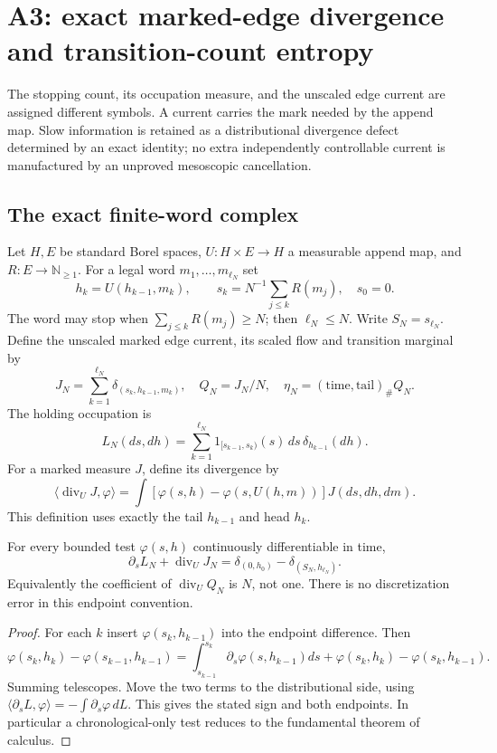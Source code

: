 \section{A3: exact marked-edge divergence and transition-count entropy}
\label{sec:r33-a3}

The stopping count, its occupation measure, and the unscaled edge current are assigned different symbols. A current carries the mark needed by the append map. Slow information is retained as a distributional divergence defect determined by an exact identity; no extra independently controllable current is manufactured by an unproved mesoscopic cancellation.

\subsection{The exact finite-word complex}
Let $H,E$ be standard Borel spaces, $U:H\times E\to H$ a measurable append map, and $R:E\to\mathbb N_{\ge1}$. For a legal word $m_1,\ldots,m_{\ell_N}$ set
\[
 h_k=U(h_{k-1},m_k),\qquad s_k=N^{-1}\sum_{j\le k}R(m_j),\quad s_0=0.
\]
The word may stop when $\sum_{j\le k}R(m_j)\ge N$; then $\ell_N\le N$. Write $S_N=s_{\ell_N}$. Define the unscaled marked edge current, its scaled flow and transition marginal by
\[
 J_N=\sum_{k=1}^{\ell_N}\delta_{(s_k,h_{k-1},m_k)},\quad
 Q_N=J_N/N,\quad \eta_N=(\mathrm{time},\mathrm{tail})_\#Q_N.
\]
The holding occupation is
\[
 L_N(ds,dh)=\sum_{k=1}^{\ell_N}1_{[s_{k-1},s_k)}(s)\,ds\,\delta_{h_{k-1}}(dh).
\]
For a marked measure $J$, define its divergence by
\[
 \langle\operatorname{div}_U J,\varphi\rangle
 =\int[\varphi(s,h)-\varphi(s,U(h,m))]J(ds,dh,dm).
\]
This definition uses exactly the tail $h_{k-1}$ and head $h_k$.

\begin{theorem}
\label{thm:r33-a3-balance}
For every bounded test $\varphi(s,h)$ continuously differentiable in time,
\[
 \partial_sL_N+\operatorname{div}_U J_N
 =\delta_{(0,h_0)}-\delta_{(S_N,h_{\ell_N})}.
\]
Equivalently the coefficient of $\operatorname{div}_UQ_N$ is $N$, not one. There is no discretization error in this endpoint convention.
\end{theorem}

\begin{proof}
For each $k$ insert $\varphi(s_k,h_{k-1})$ into the endpoint difference. Then
\[
 \varphi(s_k,h_k)-\varphi(s_{k-1},h_{k-1})
 =\int_{s_{k-1}}^{s_k}\partial_s\varphi(s,h_{k-1})ds
    +\varphi(s_k,h_k)-\varphi(s_k,h_{k-1}).
\]
Summing telescopes. Move the two terms to the distributional side, using $\langle\partial_sL,\varphi\rangle=-\int\partial_s\varphi\,dL$. This gives the stated sign and both endpoints. In particular a chronological-only test reduces to the fundamental theorem of calculus.
\end{proof}


